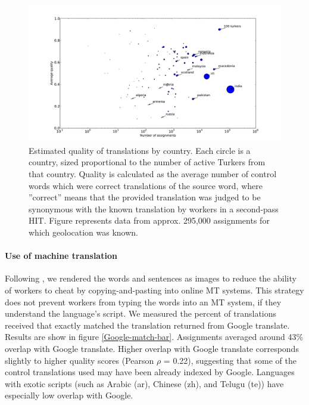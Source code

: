 \documentclass[11pt]{article}
\begin{document}
\begin{figure}[h]
\centering
\includegraphics[width=6in]{final-figures/quality-scatter}
\caption{Estimated quality of translations by country. Each circle is a country, sized proportional to the number of active Turkers from that country. Quality is calculated as the average number of control words which were correct translations of the source word, where ”correct” means that the provided translation was judged to be synonymous with the known translation by workers in a second-pass HIT. Figure represents data from approx. 295,000 assignments for which geolocation was known.}
\label{quality-scatter}
\end{figure}

\paragraph{Use of machine translation}
Following , we rendered the words and sentences as images to reduce the ability of workers to cheat by copying-and-pasting into online MT systems.  This strategy does not prevent workers from typing the words into an MT system, if they understand the language's script. We measured the percent of translations received that exactly matched the translation returned from Google translate. Results are show in figure \ref{Google-match-bar}. Assignments averaged around 43\% overlap with Google translate. Higher overlap with Google translate corresponds slightly to higher quality scores (Pearson $\rho$ = 0.22), suggesting that some of the control translations used may have been already indexed by Google. Languages with exotic scripts (such as Arabic (ar), Chinese (zh), and Telugu (te)) have especially low overlap with Google. 
\end{document}
